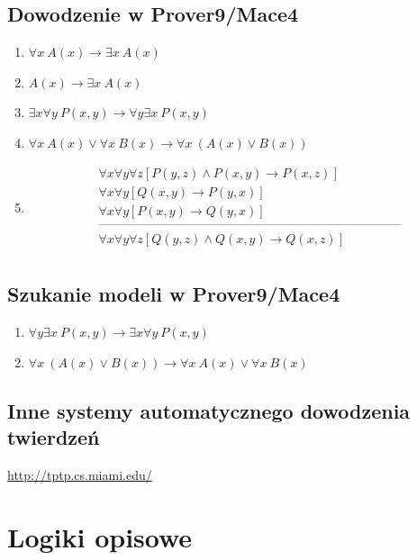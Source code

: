 \documentclass[12pt]{article}
\begin{document}
\subsection{Dowodzenie w Prover9/Mace4}%
\begin{enumerate}
	\item $\forall x~ A(x) \to \exists x~ A(x)$%
	\item $A(x) \to \exists x~ A(x)$%
	\item $\exists x \forall y~ P(x,y) \to \forall y \exists x~ P(x, y)$%
	\item $\forall x~ A(x) \lor \forall x~ B(x) \to \forall x~ (A(x) \lor B(x))$%
	\item 
\begin{eqnarray*}
& \forall x \forall y \forall z [P(y,z) \land P(x,y) \to P(x,z)] \nonumber \\
& \forall x \forall y [Q(x,y) \to P(y,x)] \nonumber \\
& \forall x \forall y [P(x,y) \to Q(y,x)] \nonumber \\
& \textrm{------------------------------------------------------------------------}\nonumber \\
& \forall x \forall y \forall z [Q(y,z) \land Q(x,y) \to Q(x,z)] \nonumber \\
\end{eqnarray*}
\end{enumerate}
%

\subsection{Szukanie modeli w Prover9/Mace4}%
\begin{enumerate}
\item $\forall y \exists x~ P(x, y) \to \exists x \forall y~ P(x,y)$%
\item $\forall x~ (A(x) \lor B(x)) \to \forall x~ A(x) \lor \forall x~ B(x)$
\end{enumerate}
%

\subsection{Inne systemy automatycznego dowodzenia twierdzeń}%
\url{http://tptp.cs.miami.edu/}
%

\section{Logiki opisowe}
\end{document}
